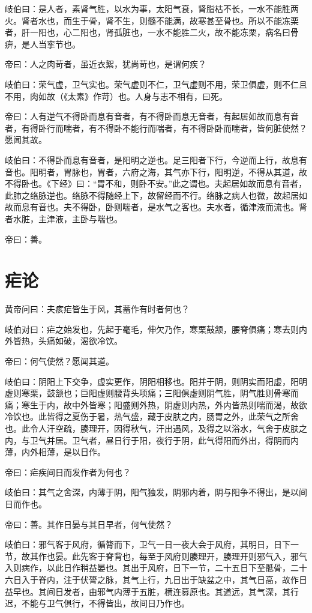 \documentclass{article}%
\begin{document}
岐伯曰：是人者，素肾气胜，以水为事，太阳气衰，肾脂枯不长，一水不能胜两火。肾者水也，而生于骨，肾不生，则髓不能满，故寒甚至骨也。所以不能冻栗者，肝一阳也，心二阳也，肾孤脏也，一水不能胜二火，故不能冻栗，病名曰骨痹，是人当挛节也。

帝曰：人之肉苛者，虽近衣絮，犹尚苛也，是谓何疾？

岐伯曰：荣气虚，卫气实也。荣气虚则不仁，卫气虚则不用，荣卫俱虚，则不仁且不用，肉如故（《太素》作苛）也。人身与志不相有，曰死。

帝曰：人有逆气不得卧而息有音者，有不得卧而息无音者，有起居如故而息有音者，有得卧行而喘者，有不得卧不能行而喘者，有不得卧卧而喘者，皆何脏使然？愿闻其故。

岐伯曰：不得卧而息有音者，是阳明之逆也。足三阳者下行，今逆而上行，故息有音也。阳明者，胃脉也，胃者，六府之海，其气亦下行，阳明逆，不得从其道，故不得卧也。《下经》曰：“胃不和，则卧不安。”此之谓也。夫起居如故而息有音者，此肺之络脉逆也。络脉不得随经上下，故留经而不行。络脉之病人也微，故起居如故而息有音也。夫不得卧，卧则喘者，是水气之客也。夫水者，循津液而流也。肾者水脏，主津液，主卧与喘也。

帝曰：善。
\section{疟论}
黄帝问曰：夫痎疟皆生于风，其蓄作有时者何也？

岐伯对曰：疟之始发也，先起于毫毛，伸欠乃作，寒栗鼓颔，腰脊俱痛；寒去则内外皆热，头痛如破，渴欲冷饮。

帝曰：何气使然？愿闻其道。

岐伯曰：阴阳上下交争，虚实更作，阴阳相移也。阳并于阴，则阴实而阳虚，阳明虚则寒栗，鼓颔也；巨阳虚则腰背头项痛；三阳俱虚则阴气胜，阴气胜则骨寒而痛；寒生于内，故中外皆寒；阳盛则外热，阴虚则内热，外内皆热则喘而渴，故欲冷饮也。此皆得之夏伤于暑，热气盛，藏于皮肤之内，肠胃之外，此荣气之所舍也。此令人汗空疏，腠理开，因得秋气，汗出遇风，及得之以浴水，气舍于皮肤之内，与卫气并居。卫气者，昼日行于阳，夜行于阴，此气得阳而外出，得阴而内薄，内外相薄，是以日作。

帝曰：疟疾间日而发作者为何也？

岐伯曰：其气之舍深，内薄于阴，阳气独发，阴邪内着，阴与阳争不得出，是以间日而作也。

帝曰：善。其作日晏与其日早者，何气使然？

岐伯曰：邪气客于风府，循膂而下，卫气一日一夜大会于风府，其明日，日下一节，故其作也晏。此先客于脊背也，每至于风府则腠理开，腠理开则邪气入，邪气入则病作，以此日作稍益晏也。其出于风府，日下一节，二十五日下至骶骨，二十六日入于脊内，注于伏膂之脉，其气上行，九日出于缺盆之中，其气日高，故作日益早也。其间日发者，由邪气内薄于五脏，横连募原也。其道远，其气深，其行迟，不能与卫气俱行，不得皆出，故间日乃作也。
\end{document}
